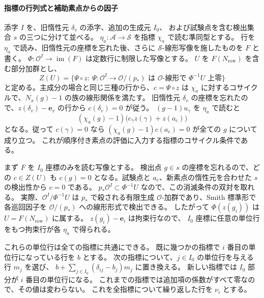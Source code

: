 \paragraph{指標の行列式と補助素点からの因子}
添字 \(I\) を、旧惰性元 \(\delta_v\) の添字、追加の生成元 \(I_0\)、
および試験点を含む検出集合 \(s\) の三つに分けて並べる。
\(\eta_a\colon\mathcal A\to\mathcal S\) を指標 \(\chi_a\) で読む準同型とする。
行を \(\eta_a\) で読み、旧惰性元の座標を忘れた後、さらに
\(\mathcal S\)-線形写像を施したものを \(F\) と書く。
\(\Phi:\mathcal O^I\to\operatorname{im}(F)\) は定数行に制限した写像とする。
\(U\) を \(F(N_\mathrm{row})\) を含む部分加群とし、
\[
 Z(U)=\{\Psi\circ z:\ \Psi:\mathcal O^I\to\mathcal O/(p_\ast)
      \text{ は }\mathcal O\text{-線形で }\Phi^{-1}U\text{ 上零}\}
\]
と定める。主成分の場合と同じ三種の行から、\(c=\Psi\circ z\) は
\(\chi_a\) に対するコサイクルで、\(N_x(g)-1\) の族の線形関係を満たす。
旧惰性元 \(\delta_v\) の座標を忘れたので、\(z(\delta_v)-\mathbf e_v\)
の行から \(c(\delta_v)=0\) が従う。
\((g-1)u_\gamma\) を \(\eta_a\) で読むと
\[
 (\chi_a(g)-1)\bigl(c_\gamma z(\gamma)+z(a_{\mathrm c})\bigr)
\]
となる。従って \(c(\gamma)=0\) なら
\((\chi_a(g)-1)c(a_{\mathrm c})=0\) が全ての \(g\) について成り立つ。
これが順序付き素点の評価に入力する指標のコサイクル条件である。

まず \(F\) を \(I_0\) 座標のみを読む写像とする。
検出点 \(g\in s\) の座標を忘れるので、どの \(c\in Z(U)\) も
\(c(g)=0\) となる。試験点と \(a_{\mathrm c}\)、新素点の惰性元を合わせた
\(s\) の検出性から \(c=0\) である。
\(p_\ast\mathcal O^I\subset\Phi^{-1}U\) なので、この消滅条件の双対を取れる。
実際、\(\mathcal O^I/\Phi^{-1}U\) は \(p_\ast\) で殺される有限生成
\(\mathcal O\)-加群であり、Smith 標準形で各巡回因子を
\(\mathcal O/(p_\ast)\) への線形形式で検出できる。
したがって \(\Phi(z(g_i))\) は \(U=F(N_\mathrm{row})\) に属する。
\(z(g_i)-\mathbf e_i\) は拘束行なので、
\(I_0\) 座標に任意の単位行をもつ拘束行が各 \(\eta_a\) で得られる。

これらの単位行は全ての指標に共通にできる。
既に幾つかの指標で \(i\) 番目の単位行になっている行を \(b\) とする。
次の指標について、\(j\in I_0\) の単位行を与える行 \(m_j\) を選び、
\(b+\sum_{j\in I_0}(\delta_{ij}-b_j)m_j\) に置き換える。
新しい指標では \(I_0\) 部分が \(i\) 番目の単位行になる。
これまでの指標では追加項の係数がすべて零なので、その値は変わらない。
これを全指標について繰り返した行を \(\nu_i\) とする。

